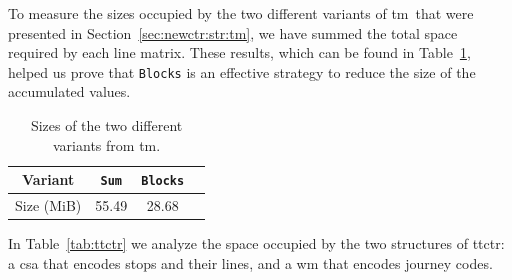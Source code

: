     To measure the sizes occupied by the two different variants of \gls{tm}~that were presented in Section~\ref{sec:newctr:str:tm}, we have summed the total space required by each line matrix. These results, which can be found in Table~\ref{tab:acuum}, helped us prove that \texttt{Blocks} is an effective strategy to reduce the size of the accumulated values. %
    
    \begin{table}[ht]
        \centering
        \caption{Sizes of the two different variants from \acrshort{tm}.}
        \label{tab:acuum}
        \begin{tabular}{|c|c|c|c|}
        \hline
            Variant & \texttt{Sum} & \texttt{Blocks} \\
            \hline
            Size (MiB) & 55.49 & 28.68 \\
        \hline
        \end{tabular}
    \end{table}
    
    In Table~\ref{tab:ttctr} we analyze the space occupied by the two structures of \gls{ttctr}: a \gls{csa} that encodes stops and their lines, and a \gls{wm} that encodes journey codes.
    

